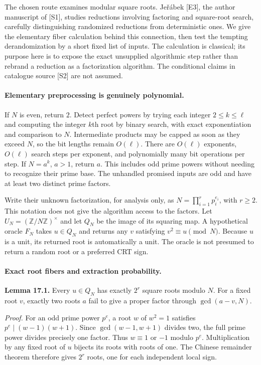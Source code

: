 \documentclass[11pt]{article}
\begin{document}
The chosen route examines modular square roots. Je\v r\'abek [E3], the
author manuscript of [S1], studies reductions involving factoring and
square-root search, carefully distinguishing randomized reductions from
deterministic ones. We give the elementary fiber calculation behind this
connection, then test the tempting derandomization by a short fixed list
of inputs. The calculation is classical; its purpose here is to expose
the exact unsupplied algorithmic step rather than rebrand a reduction as
a factorization algorithm. The conditional claims in catalogue source
[S2] are not assumed.

\paragraph{Elementary preprocessing is genuinely polynomial.}
If $N$ is even, return $2$. Detect perfect powers by trying each integer
$2\le k\le\ell$ and computing the integer $k$th root by binary search,
with exact exponentiation and comparison to $N$. Intermediate products
may be capped as soon as they exceed $N$, so the bit lengths remain
$O(\ell)$. There are $O(\ell)$ exponents, $O(\ell)$ search steps per
exponent, and polynomially many bit operations per step. If $N=a^k$,
$a>1$, return $a$. This includes odd prime powers without needing to
recognize their prime base. The unhandled promised inputs are odd and
have at least two distinct prime factors.

Write their unknown factorization, for analysis only, as
$N=\prod_{i=1}^r p_i^{e_i}$, with $r\ge2$. This notation does not give
the algorithm access to the factors. Let $U_N=(\mathbb Z/N\mathbb Z)^\times$
and let $Q_N$ be the image of its squaring map. A hypothetical oracle
$F_N$ takes $u\in Q_N$ and returns any $v$ satisfying $v^2\equiv u\pmod N$.
Because $u$ is a unit, its returned root is automatically a unit. The
oracle is not presumed to return a random root or a preferred CRT sign.

\paragraph{Exact root fibers and extraction probability.}
\textbf{Lemma 17.1.} Every $u\in Q_N$ has exactly $2^r$ square roots
modulo $N$. For a fixed root $v$, exactly two roots $a$ fail to give a
proper factor through $\gcd(a-v,N)$.

\textit{Proof.}
For an odd prime power $p^e$, a root $w$ of $w^2=1$ satisfies
$p^e\mid(w-1)(w+1)$. Since $\gcd(w-1,w+1)$ divides two, the full
prime power divides precisely one factor. Thus $w\equiv1$ or $-1$
modulo $p^e$. Multiplication by any fixed root of $u$ bijects its roots
with roots of one. The Chinese remainder theorem therefore gives $2^r$
roots, one for each independent local sign.
\end{document}
